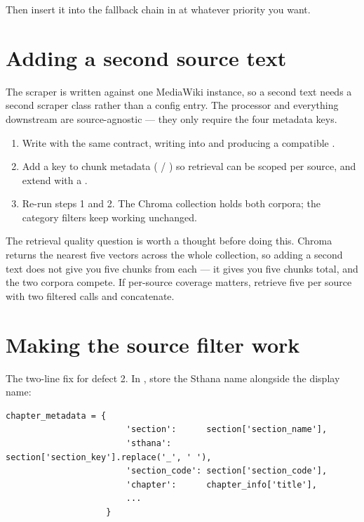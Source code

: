 Then insert it into the fallback chain in  at whatever priority you want.

\section{Adding a second source text}

The scraper is written against one MediaWiki instance, so a second text needs a second scraper class rather than a config entry. The processor and everything downstream are source-agnostic --- they only require the four metadata keys.

\begin{enumerate}[leftmargin=*]
  \item Write  with the same  contract, writing into  and producing a compatible .
  \item Add a  key to chunk metadata ( / ) so retrieval can be scoped per source, and extend  with a .
  \item Re-run steps 1 and 2. The Chroma collection holds both corpora; the category filters keep working unchanged.
\end{enumerate}

The retrieval quality question is worth a thought before doing this. Chroma returns the nearest five vectors across the whole collection, so adding a second text does not give you five chunks from each --- it gives you five chunks total, and the two corpora compete. If per-source coverage matters, retrieve five per source with two filtered calls and concatenate.

\section{Making the source filter work}

The two-line fix for defect 2. In , store the Sthana name alongside the display name:

\begin{lstlisting}[style=py]
                    chapter_metadata = {
                        'section':      section['section_name'],
                        'sthana':       section['section_key'].replace('_', ' '),
                        'section_code': section['section_code'],
                        'chapter':      chapter_info['title'],
                        ...
                    }
\end{lstlisting}

